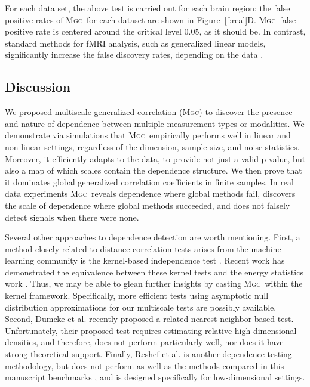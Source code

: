 \documentclass[11pt]{article}
\providecommand{\sct}[1]{{\normalfont\textsc{#1}}}
\newcommand{\Mgc}{\sct{Mgc}}
\begin{document}
For each data set, the above test is carried out for each brain region; the false positive rates of \Mgc~for each dataset are shown in Figure~\ref{f:real}D. %
\Mgc~false positive rate is centered around the critical level $0.05$, as it should be.
In contrast,  standard methods for fMRI analysis, such as generalized linear models, significantly increase the false discovery rates, depending on the data \cite{EklundKnutsson2012,Eklund2015}.

\subsection*{Discussion}
\label{conclu}

We proposed multiscale generalized correlation (\Mgc) to discover the presence and nature of dependence between multiple measurement types or modalities.
We demonstrate via simulations that \Mgc~empirically performs well in linear and non-linear settings, regardless of the dimension, sample size, and noise statistics.  Moreover, it efficiently adapts to the data, to provide not just a valid p-value, but also a map of which scales contain the dependence structure. We then prove that it dominates global generalized correlation coefficients in finite samples.
In real data experiments \Mgc~reveals dependence where global methods fail, discovers the scale of dependence where global methods succeeded, and does not falsely detect signals when there were none.


Several other approaches to dependence detection are worth mentioning.
First, a method closely related to distance correlation tests arises from the machine learning community is the kernel-based independence test  \cite{GrettonEtAl2005, GrettonGyorfi2010, GrettonEtAl2012}.  Recent work has demonstrated the equivalence between these kernel tests and the energy statistics work \cite{SejdinovicEtAl2013, RamdasEtAl2015}. Thus, we may be able to glean further insights by casting \Mgc~within the kernel framework. Specifically, more efficient tests using asymptotic null distribution approximations for our multiscale tests are possibly available.
Second, Dumcke et al. \cite{Dumcke2014} recently proposed a related nearest-neighbor based test.  Unfortunately, their proposed test requires estimating relative high-dimensional densities, and therefore, does not perform particularly well, nor does it have strong theoretical support.
Finally, Reshef et al. \cite{Reshef2011} is another dependence testing methodology, but does not perform as well as the methods compared in this manuscript  benchmarks \cite{SimonTibshirani2012}, and is designed specifically for low-dimensional settings.
\end{document}
